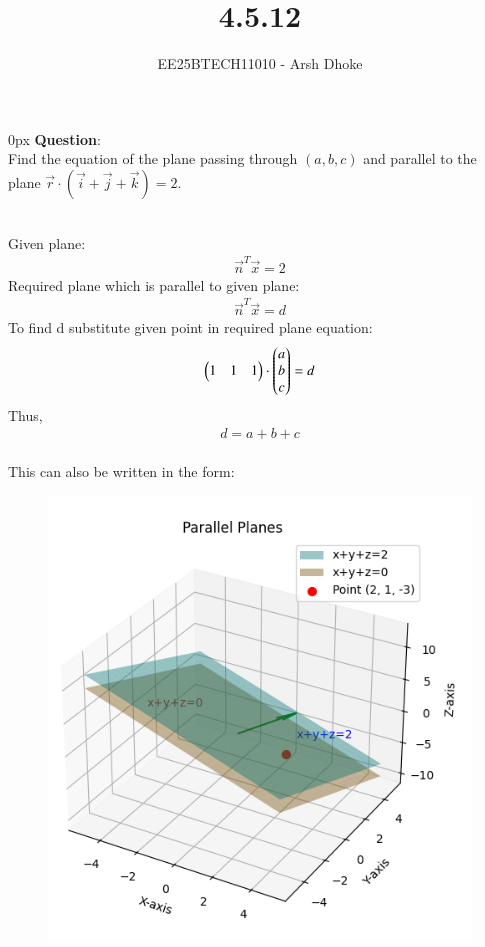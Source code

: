 \documentclass[journal]{IEEEtran}
\begin{document}

\vspace{3cm}

\title{4.5.12}
\author{EE25BTECH11010 - Arsh Dhoke}
{\let\newpage\relax\maketitle}

\renewcommand{\thefigure}{\theenumi}
\renewcommand{\thetable}{\theenumi}
\setlength{\intextsep}{10pt}
\renewcommand{\thetable}{\theenumi}

\parindent 0px
\textbf{Question}:\\
Find the equation of the plane passing through 
$(a,b,c)$ and parallel to the plane $\vec{r}\cdot(\vec{i}+\vec{j}+\vec{k})=2$.

\solution \\



    
Given plane:
\begin{align}
\vec{n}^T \vec{x} = 2
\end{align}
Required plane which is parallel to given plane:
\begin{align}
\vec{n}^T \vec{x}=d
\end{align}
To find d substitute given point in required plane equation:
\begin{align}
\begin{pmatrix}1&1&1\end{pmatrix}\cdot\begin{pmatrix}a\\b\\c\end{pmatrix}=d
\end{align}
Thus,
\begin{align}
    d=a+b+c
\end{align}
 \\

This can also be written in the form:


\begin{figure}[ht!]
\centering
\includegraphics[height=0.6\textheight, keepaspectratio]{figs/q7.png}
\end{figure}
\end{document}
